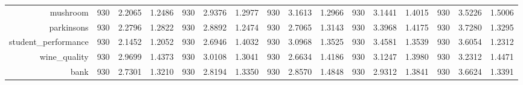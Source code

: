 \begin{table}[htbp]
{\begin{tabular}{rccccccccccccccc}
                  mushroom                            & 930                                   & \cellcolor[rgb]{ .776,  .937,  .808}\textcolor[rgb]{ 0,  .38,  0}{2.2065}          & 1.2486          & 930            & 2.9376                                                                    & 1.2977          & 930            & 3.1613                                                                    & 1.2966          & 930            & 3.1441                                                                    & 1.4015          & 930            & 3.5226          & 1.5006          \\
                  parkinsons                          & 930                                   & \cellcolor[rgb]{ .776,  .937,  .808}\textcolor[rgb]{ 0,  .38,  0}{2.2796}          & 1.2822          & 930            & 2.8892                                                                    & 1.2474          & 930            & 2.7065                                                                    & 1.3143          & 930            & 3.3968                                                                    & 1.4175          & 930            & 3.7280          & 1.3295          \\
                  student\_performance                & 930                                   & \cellcolor[rgb]{ .776,  .937,  .808}\textcolor[rgb]{ 0,  .38,  0}{2.1452}          & 1.2052          & 930            & 2.6946                                                                    & 1.4032          & 930            & 3.0968                                                                    & 1.3525          & 930            & 3.4581                                                                    & 1.3539          & 930            & 3.6054          & 1.2312          \\
                  wine\_quality                       & 930                                   & 2.9699                                                                             & 1.4373          & 930            & 3.0108                                                                    & 1.3041          & 930            & \cellcolor[rgb]{ .776,  .937,  .808}\textcolor[rgb]{ 0,  .38,  0}{2.6634} & 1.4186          & 930            & 3.1247                                                                    & 1.3980          & 930            & 3.2312          & 1.4471          \\
                  bank                                & 930                                   & 2.7301                                                                             & 1.3210          & 930            & 2.8194                                                                    & 1.3350          & 930            & 2.8570                                                                    & 1.4848          & 930            & 2.9312                                                                    & 1.3841          & 930            & 3.6624          & 1.3391          \\

\end{tabular}}
\end{table}
